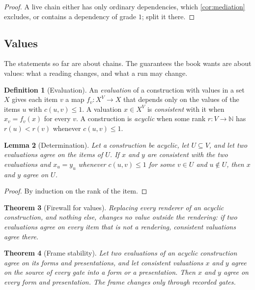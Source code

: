 \documentclass[11pt]{article}
\numberwithin{equation}{section}
\theoremstyle{definition}
\newtheorem{definition}{Definition}[section]
\theoremstyle{plain}
\newtheorem{theorem}[definition]{Theorem}
\newtheorem{lemma}[definition]{Lemma}
\theoremstyle{remark}
\begin{document}
\begin{proof}
A live chain either has only ordinary dependencies, which
\cref{cor:mediation} excludes, or contains a dependency of grade \(1\);
split it there.
\end{proof}

\subsection{Values}\label{sec:values}

The statements so far are about chains.  The guarantees the book wants are
about values: what a reading changes, and what a run may change.

\begin{definition}[Evaluation]\label{def:evaluation}
An \emph{evaluation} of a construction with values in a set \(X\) gives each
item \(v\) a map \(f_v:X^V\to X\) that depends only on the values of the
items \(u\) with \(c(u,v)\le1\).  A valuation \(x\in X^V\) is
\emph{consistent} with it when \(x_v=f_v(x)\) for every \(v\).  A
construction is \emph{acyclic} when some rank \(r:V\to\mathbb N\) has
\(r(u)<r(v)\) whenever \(c(u,v)\le1\).
\end{definition}

\begin{lemma}[Determination]\label{lem:determination}
Let a construction be acyclic, let \(U\subseteq V\), and let two evaluations
agree on the items of \(U\).  If \(x\) and \(y\) are consistent with the two
evaluations and \(x_u=y_u\) whenever \(c(u,v)\le1\) for some \(v\in U\) and
\(u\notin U\), then \(x\) and \(y\) agree on \(U\).
\end{lemma}

\begin{proof}
By induction on the rank of the item.
\end{proof}

\begin{theorem}[Firewall for values]\label{thm:firewall-values}
Replacing every renderer of an acyclic construction, and nothing else,
changes no value outside the rendering: if two evaluations agree on every
item that is not a rendering, consistent valuations agree there.
\end{theorem}

\begin{theorem}[Frame stability]\label{thm:frame-stable}
Let two evaluations of an acyclic construction agree on its forms and
presentations, and let consistent valuations \(x\) and \(y\) agree on the
source of every gate into a form or a presentation.  Then \(x\) and \(y\)
agree on every form and presentation.  The frame changes only through
recorded gates.
\end{theorem}
\end{document}
